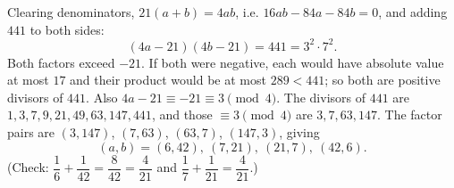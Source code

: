 Clearing denominators, $21(a+b)=4ab$, i.e. $16ab-84a-84b=0$, and adding $441$ to both sides:
\[(4a-21)(4b-21)=441=3^2\cdot7^2 .\]
Both factors exceed $-21$. If both were negative, each would have absolute value at most $17$ and their product would be at most $289<441$; so both are positive divisors of $441$. Also $4a-21\equiv-21\equiv3\pmod4$. The divisors of $441$ are $1,3,7,9,21,49,63,147,441$, and those $\equiv3\pmod4$ are $3,7,63,147$. The factor pairs are $(3,147)$, $(7,63)$, $(63,7)$, $(147,3)$, giving
\[(a,b)=\boxed{(6,42),\ (7,21),\ (21,7),\ (42,6)}.\]
(Check: $\dfrac{1}{6}+\dfrac{1}{42}=\dfrac{8}{42}=\dfrac{4}{21}$ and $\dfrac{1}{7}+\dfrac{1}{21}=\dfrac{4}{21}$.)
